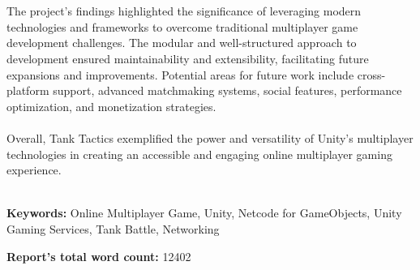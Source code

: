 \\
\noindent
\\
The project's findings highlighted the significance of leveraging modern technologies and frameworks to overcome traditional multiplayer game development challenges. The modular and well-structured approach to development ensured maintainability and extensibility, facilitating future expansions and improvements. Potential areas for future work include cross-platform support, advanced matchmaking systems, social features, performance optimization, and monetization strategies.
\\
\noindent
\\
Overall, Tank Tactics exemplified the power and versatility of Unity's multiplayer technologies in creating an accessible and engaging online multiplayer gaming experience.



~\\[1cm]
\noindent %
\textbf{Keywords:} Online Multiplayer Game, Unity, Netcode for GameObjects, Unity Gaming Services, Tank Battle, Networking

\vfill
\noindent
\textbf{Report's total word count:} 12402

